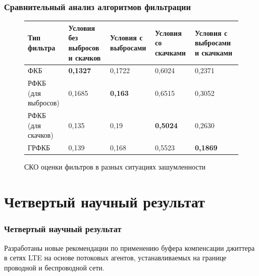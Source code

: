 \documentclass[10pt,pdf,hyperref={unicode}]{beamer}
\begin{document}
\begin{frame}
\frametitle{Сравнительный анализ алгоритмов фильтрации}
\begin{scriptsize}

\pgfplotsset{width=10cm, height=4cm, compat=newest}
\begin{figure} [!h]
  \center
{}
\caption*{СКО оценки фильтров в разных ситуациях зашумленности}


\begin{tabular}{|p{1.5cm}|p{1.5cm}|p{1.5cm}|p{1.5cm}|p{1.5cm}|}
    \hline
    Тип фильтра        & Условия без выбросов и скачков & Условия с выбросами & Условия со скачками  & Условия с выбросами и скачками \\ \hline
    ФКБ                 & \textbf{0,1327}                 & 0,1722                   & 0,6024                 & 0,2371                           \\ \hline
    РФКБ (для выбросов) & 0,1685                          &  \textbf{0,163}       & 0,6515                 & 0,3052                           \\ \hline
    РФКБ (для скачков)   & 0,135                           & 0,19               & \textbf{0,5024}                & 0,2630                             \\ \hline
    ГРФКБ               & 0,139                          & 0,168               &   0,5523            & \textbf{0,1869}                           \\ \hline
    \end{tabular}
\end{figure}
\end{scriptsize}
\end{frame}





\section{Четвертый научный результат}

\begin{frame}
\frametitle{Четвертый научный результат}

{\Large Разработаны новые рекомендации по применению буфера компенсации джиттера в сетях LTE на основе потоковых агентов, устанавливаемых на границе проводной и беспроводной сети.}

\end{frame}
\end{document}
